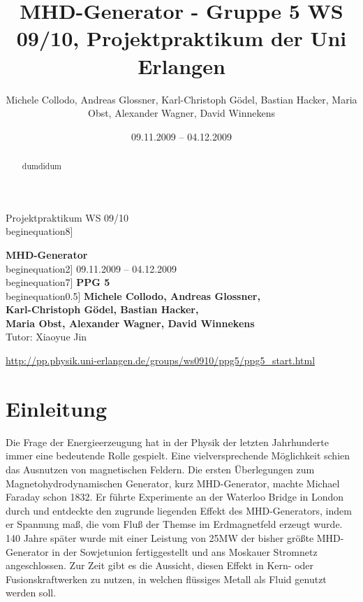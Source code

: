 \documentclass[11pt]{scrartcl}
\title{MHD-Generator - Gruppe 5 WS 09/10, Projektpraktikum der Uni Erlangen}
\date{09.11.2009 -- 04.12.2009}
\author{Michele Collodo, Andreas Glossner, Karl-Christoph G\"odel, Bastian Hacker, Maria Obst, Alexander Wagner, David Winnekens}
\begin{document}
\sloppy %
\thispagestyle{empty}
\large{Projektpraktikum WS 09/10}
\hfill
{}
\\begin{equation}8\baselineskip]
\begin{center}
{\fontsize{36}{54}\textbf{MHD-Generator}}
\\begin{equation}2\baselineskip]
{\Large 09.11.2009 -- 04.12.2009}
\\begin{equation}7\baselineskip]
{\huge\textbf{PPG 5}}\\begin{equation}0.5\baselineskip]
{\large\textbf{
Michele Collodo,
Andreas Glossner,\\
Karl-Christoph G\"odel,
Bastian Hacker,\\
Maria Obst,
Alexander Wagner,
David Winnekens}\\
Tutor: Xiaoyue Jin}
\vfill



\small{\url{http://pp.physik.uni-erlangen.de/groups/ws0910/ppg5/ppg5\_start.html}}
\end{center}
\newpage



\tableofcontents
\vfill



\begin{abstract}
dumdidum
\end{abstract}
\newpage


\section{Einleitung}	%
Die Frage der Energieerzeugung hat in der Physik der letzten Jahrhunderte immer eine bedeutende Rolle gespielt. Eine vielversprechende M\"oglichkeit schien das Ausnutzen von magnetischen Feldern. Die ersten \"Uberlegungen zum Magnetohydrodynamischen Generator, kurz MHD-Generator, machte Michael Faraday schon 1832. Er führte Experimente an der Waterloo Bridge in London durch und entdeckte den zugrunde liegenden Effekt des MHD-Generators, indem er Spannung maß, die vom Fluß der Themse im Erdmagnetfeld erzeugt wurde.
140 Jahre später wurde mit einer Leistung von 25MW der bisher größte MHD-Generator in der Sowjetunion fertiggestellt und ans Moskauer Stromnetz angeschlossen. Zur Zeit gibt es die Aussicht, diesen Effekt in Kern- oder Fusionskraftwerken zu nutzen, in welchen flüssiges Metall als Fluid genutzt werden soll.
\end{document}
